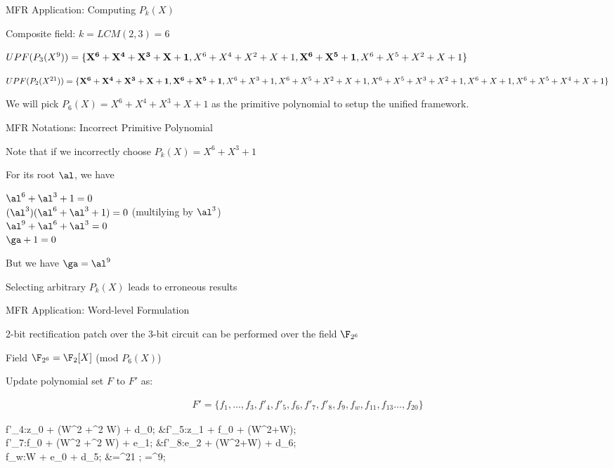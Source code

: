 \begin{frame}{\large MFR Application: Computing $P_k(X)$}
\bi
	\item Composite field: $k=LCM(2,3)=6$
	\vspace{0.1in}
	\bi
		\item $UPF(P_3(X^9)) = \{{\bf X^6+X^4+X^3+X+1},X^6+X^4+X^2+X+1,{\bf X^6+X^5+1}, X^6+X^5+X^2+X+1\}$
		\vspace{0.1in}
		\item $UPF(P_2(X^{21})) = \{{\bf X^6+X^4+X^3+X+1}, {\bf X^6+X^5+1}, X^6+X^3+1, X^6+X^5+X^2+X+1, X^6+X^5+X^3+X^2+1, X^6+X+1, X^6+X^5+X^4+X+1 \}$
		\vspace{0.1in}
		\item We will pick $P_6(X)=X^6+X^4+X^3+X+1$ as the primitive polynomial to setup the unified framework.
	\ei
\ei
\end{frame}

\begin{frame}{\large MFR Notations: Incorrect Primitive Polynomial}
\bi
	\item Note that if we incorrectly choose $P_k(X)=X^6+X^3+1$
	\item For its root $\al$, we have
	\begin{center}
		$\al^6+\al^3+1=0$\\
		$(\al^3)(\al^6+\al^3+1)=0$ (multilying by $\al^3$)\\
		$\al^9+\al^6+\al^3=0$\\
		$\ga+1=0$\label{ga_val}
	\end{center}
	\item But we have $\ga=\al^9$
	\item Selecting arbitrary $P_k(X)$ leads to erroneous results
\ei
\end{frame}

\begin{frame}{\large MFR Application: Word-level Formulation }
\bi
	\item 2-bit rectification patch over the 3-bit circuit can be performed over the field $\F_{2^6}$
	\bi
		\item Field $\F_{2^6} = \F_2[X]$ (mod $P_6(X)$)
	\ei
	\vspace{0.1in}
	\item Update polynomial set $F$ to $F'$ as:
	\begin{center}
		\begin{align*}
			F'=\{f_1,\dots,f_3,f'_4,f'_5,f_6,f'_7,f'_8,f_9,f_w,f_{11},f_{13}\dots,f_{20}\}
		\end{align*}
		{\small\begin{flalign*}
			f'_4:z_0 + (\be W^2 +\be^2 W) + d_0;     &\quad f'_5:z_1 + f_0 + (W^2+W); \\
			f'_7:f_0 + (\be W^2 +\be^2 W) + e_1;   &\quad f'_8:e_2 + (W^2+W) + d_6; \\
			f_w:W + e_0 + \be d_5;             &\quad \be=\al^{21} ; \ga=\al^9;
		\end{flalign*}}
	\end{center}

\ei
\end{frame}

